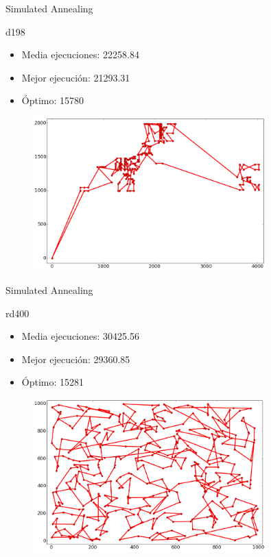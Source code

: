 \documentclass[ignorenonframetext,]{beamer}
\begin{document}
\begin{frame}{Simulated Annealing}

\begin{block}{d198}

\begin{itemize}
\item
  Media ejecuciones: 22258.84
\item
  Mejor ejecución: 21293.31
\item
  Óptimo: 15780
\end{itemize}

\begin{figure}[htbp]
\centering
\includegraphics[width=0.8\textwidth]{./images/d198sa.png}
\end{figure}

\end{block}

\end{frame}

\begin{frame}{Simulated Annealing}

\begin{block}{rd400}

\begin{itemize}
\item
  Media ejecuciones: 30425.56
\item
  Mejor ejecución: 29360.85
\item
  Óptimo: 15281
\end{itemize}

\begin{figure}[htbp]
\centering
\includegraphics[width=0.8\textwidth]{./images/rd400sa.png}
\end{figure}

\end{block}

\end{frame}
\end{document}
